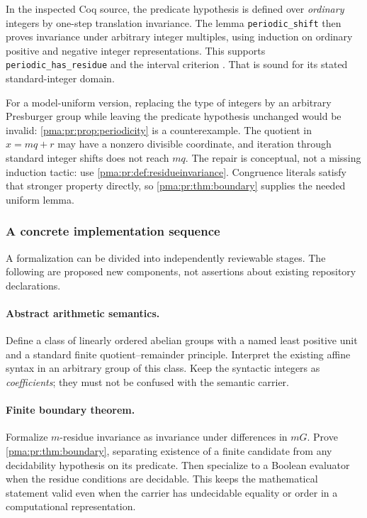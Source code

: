 \documentclass[11pt]{article}
\numberwithin{equation}{section}
\theoremstyle{definition}
\theoremstyle{remark}
\newcommand{\code}[1]{\texttt{\small #1}}
\begin{document}
In the inspected Coq source, the predicate hypothesis is defined over
\emph{ordinary} integers by one-step translation invariance. The lemma
\code{periodic\_shift} then proves invariance under arbitrary integer
multiples, using induction on ordinary positive and negative integer
representations. This supports \code{periodic\_has\_residue} and the
interval criterion \cite{proveit-cooper}. That is sound for its stated
standard-integer domain.

For a model-uniform version, replacing the type of integers by an
arbitrary Presburger group while leaving the predicate hypothesis
unchanged would be invalid: \cref{pma:pr:prop:periodicity} is a counterexample.
The quotient in $x=mq+r$ may have a nonzero divisible coordinate, and
iteration through standard integer shifts does not reach $mq$.
The repair is conceptual, not a missing induction tactic:
use \cref{pma:pr:def:residueinvariance}. Congruence literals satisfy that stronger
property directly, so \cref{pma:pr:thm:boundary} supplies the needed uniform lemma.

\subsubsection{A concrete implementation sequence}

A formalization can be divided into independently reviewable stages.
The following are proposed new components, not assertions about existing
repository declarations.

\paragraph{Abstract arithmetic semantics.}
Define a class of linearly ordered abelian groups with a named least
positive unit and a standard finite quotient--remainder principle.
Interpret the existing affine syntax in an arbitrary group of this class.
Keep the syntactic integers as \emph{coefficients}; they must not be
confused with the semantic carrier.

\paragraph{Finite boundary theorem.}
Formalize $m$-residue invariance as invariance under differences in $mG$.
Prove \cref{pma:pr:thm:boundary}, separating existence of a finite candidate from
any decidability hypothesis on its predicate. Then specialize to a
Boolean evaluator when the residue conditions are decidable. This keeps
the mathematical statement valid even when the carrier has undecidable
equality or order in a computational representation.
\end{document}

